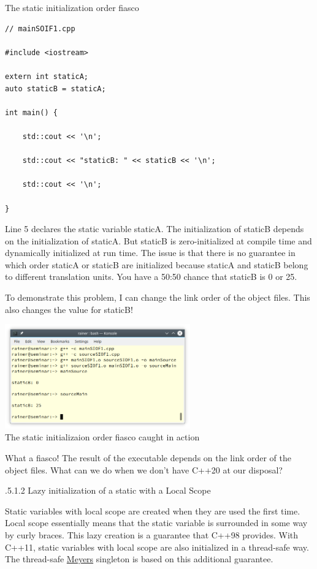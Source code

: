 \noindent
The static initialization order fiasco
\begin{lstlisting}[style=styleCXX]
// mainSOIF1.cpp

#include <iostream>

extern int staticA;
auto staticB = staticA;

int main() {
	
	std::cout << '\n';
	
	std::cout << "staticB: " << staticB << '\n';
	
	std::cout << '\n';

}
\end{lstlisting}

Line 5 declares the static variable staticA. The initialization of staticB depends on the initialization of staticA. But staticB is zero-initialized at compile time and dynamically initialized at run time. The issue is that there is no guarantee in which order staticA or staticB are initialized because staticA and staticB belong to different translation units. You have a 50:50 chance that staticB is 0 or 25.

To demonstrate this problem, I can change the link order of the object files. This also changes the value for staticB!

\begin{center}
\includegraphics[width=0.6\textwidth]{content/3/chapter4/images/37.png}\\
The static initializaion order fiasco caught in action
\end{center}

What a fiasco! The result of the executable depends on the link order of the object files. What can we do when we don’t have C++20 at our disposal?

.5.1.2\hspace{0.2cm} Lazy initialization of a static with a Local Scope

Static variables with local scope are created when they are used the first time. Local scope essentially means that the static variable is surrounded in some way by curly braces. This lazy creation is a guarantee that C++98 provides. With C++11, static variables with local scope are also initialized in a thread-safe way. The thread-safe \href{https://en.wikipedia.org/wiki/Scott_Meyers}{Meyers} singleton is based on this additional guarantee.

